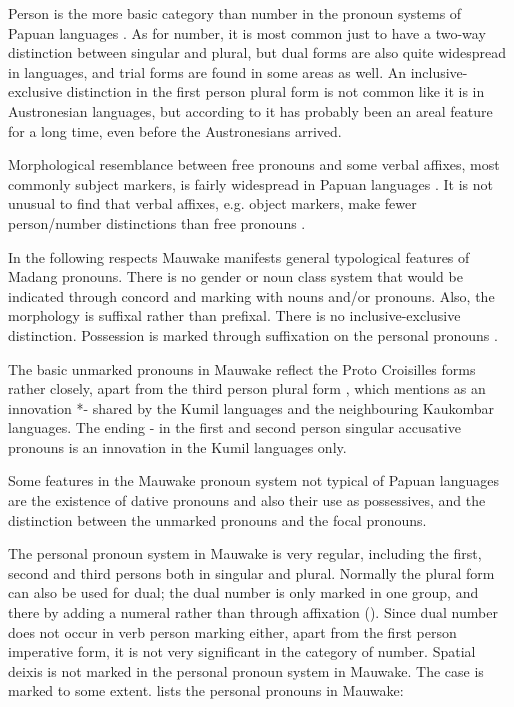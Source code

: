 Person is the more basic category than number in the pronoun systems of Papuan languages \citep[69]{Foley1986}. As for number, it is most common just to have a two-way distinction between singular and plural, but dual forms are also quite widespread in  languages, and trial forms are found in some areas as well. An inclusive-exclusive distinction in the first person plural form is not common \citep[60]{Wurm1982} like it is in Austronesian languages, but according to \citet[56]{Ross2005} it has probably been an areal feature for a long time, even before the Austronesians arrived. 

Morphological resemblance between free pronouns and some verbal affixes, most commonly subject markers, is fairly widespread in Papuan languages \citep{Franklin1979}. It is not unusual to find that verbal affixes, e.g. object markers, make fewer person/number distinctions than free pronouns \citep[67]{Foley1986}.

In the following respects Mauwake manifests general typological features of  Madang pronouns. There is no gender or noun class system that would be indicated through concord and marking with nouns and/or pronouns. Also, the morphology is suffixal rather than prefixal. There is no inclusive-exclusive distinction. Possession is marked through suffixation on the personal pronouns \citep[40--42]{Wurm1982}. 

The basic unmarked pronouns in Mauwake reflect the Proto Croisilles forms rather closely, apart from the third person plural form , which \citet[23]{Ross1996} mentions as an innovation *- shared by the Kumil languages and the neighbouring Kaukombar languages. The ending - in the first and second person singular accusative pronouns is an innovation in the Kumil languages only. 

Some features in the Mauwake pronoun system not typical of Papuan languages are the existence of dative pronouns and also their use as possessives, and the distinction between the unmarked pronouns and the focal pronouns. 

The personal pronoun system in Mauwake is very regular, including the first, second and third persons both in singular and plural. Normally the plural form can also be used for dual; the dual number is only marked in one group, and there by adding a numeral rather than through affixation (). Since dual number does not occur in verb person marking either, apart from the first person imperative form, it is not very significant in the category of number. Spatial deixis is not marked in the personal pronoun system in Mauwake. The case is marked to some extent.  lists the personal pronouns in Mauwake:

